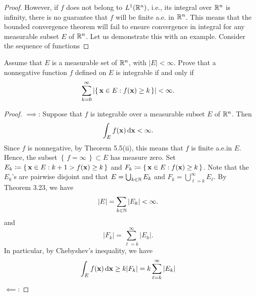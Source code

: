 \begin{proof}
However, if $f$ does not belong to $L^1(\mathbb{R}^n)$, i.e., its integral over
$\mathbb{R}^n$ is infinity, there is no guarantee that $f$ will be finite a.e.\@
in $\mathbb{R}^n$. This means that the bounded convergence theorem will fail to
ensure convergence in integral for any measurable subset $E$ of
$\mathbb{R}^n$. Let us demonstrate this with an example. Consider the sequence of
functions
\end{proof}

\begin{problem}
Assume that $E$ is a measurable set of $\mathbb{R}^n$, with
$|E|<\infty$. Prove that a nonnegative function $f$ defined
on $E$ is integrable if and only if
\[
\sum_{k=0}^\infty\left|\left\{\,\mathbf{x}\in E:f(\mathbf{x})\geq
    k\,\right\}\right|<\infty.
\]
\end{problem}
\begin{proof}
$\implies$: Suppose that $f$ is integrable over a measurable subset $E$ of
$\mathbb{R}^n$. Then
\begin{equation}
\label{eq:integrability-3}
\int_E f(\mathbf{x})\mathop{}\!\mathrm{d}\mathbf{x}<\infty.
\end{equation}
Since $f$ is nonnegative, by Theorem 5.5(ii), this means that $f$ is finite
a.e.\@ in $E$. Hence, the subset $\left\{\,f=\infty\,\right\}\subset E$ has
measure zero. Set $E_k\coloneqq\left\{\,\mathbf{x}\in E:k+1>f(\mathbf{x})\geq
  k\,\right\}$ and $F_k\coloneqq\left\{\,\mathbf{x}\in E:f(\mathbf{x})\geq
  k\,\right\}$. Note that the $E_k$'s are pairwise disjoint and that
$E=\bigcup_{k\in\mathbb{N}} E_k$ and $F_k=\bigcup_{\ell=k}^\infty E_\ell$. By
Theorem 3.23, we have
\begin{equation}
  \label{eq:disjoint-measurable-sets-3}
|E|=\sum_{k\in\mathbb{N}}|E_k|<\infty.
\end{equation}
and
\begin{equation}
\label{eq:monotonicity-of-lebesgue-3}
|F_k|=\sum_{\ell=k}^\infty|E_k|.
\end{equation}
In particular, by Chebyshev's inequality, we have
\begin{equation}
\label{eq:chebyshevs-3}
\int_Ef(\mathbf{x})\mathop{}\!\mathrm{d}\mathbf{x}\geq
k|F_k|=k\sum_{\ell=k}^\infty|E_k|
\end{equation}
$\impliedby$:
\end{proof}

